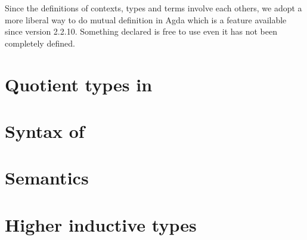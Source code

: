 Since the definitions of contexts, types and terms involve each others, we adopt a more liberal way to do mutual definition in Agda which is a feature available since version 2.2.10. Something declared is free to use even it has not been completely defined.


\section{Quotient types in \hott}


\section{Syntax of \wog}


\section{Semantics}



\section{Higher inductive types}